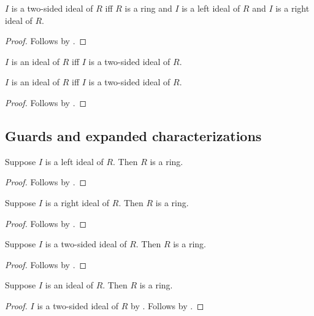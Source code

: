 \begin{proposition}\label{two_sided_ideal_iff}
    $I$ is a two-sided ideal of $R$ iff
        $R$ is a ring and
        $I$ is a left ideal of $R$ and
        $I$ is a right ideal of $R$.
\end{proposition}
\begin{proof}
    Follows by .
\end{proof}

\begin{definition}\label{ideal}
    $I$ is an ideal of $R$ iff
        $I$ is a two-sided ideal of $R$.
\end{definition}

\begin{proposition}\label{ideal_iff}
    $I$ is an ideal of $R$ iff
        $I$ is a two-sided ideal of $R$.
\end{proposition}
\begin{proof}
    Follows by .
\end{proof}

\subsection{Guards and expanded characterizations}

\begin{proposition}\label{left_ideal_ring}
    Suppose $I$ is a left ideal of $R$.
    Then $R$ is a ring.
\end{proposition}
\begin{proof}
    Follows by .
\end{proof}

\begin{proposition}\label{right_ideal_ring}
    Suppose $I$ is a right ideal of $R$.
    Then $R$ is a ring.
\end{proposition}
\begin{proof}
    Follows by .
\end{proof}

\begin{proposition}\label{two_sided_ideal_ring}
    Suppose $I$ is a two-sided ideal of $R$.
    Then $R$ is a ring.
\end{proposition}
\begin{proof}
    Follows by .
\end{proof}

\begin{proposition}\label{ideal_ring}
    Suppose $I$ is an ideal of $R$.
    Then $R$ is a ring.
\end{proposition}
\begin{proof}
    $I$ is a two-sided ideal of $R$ by .
    Follows by .
\end{proof}


